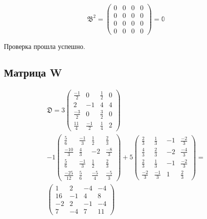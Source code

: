 \documentclass[12pt, a4paper]{article}
\begin{document}
    \begin{equation}
        \mathfrak{B}^2 = \left(\begin{matrix}
            0 & 0 & 0 & 0 \\
            0 & 0 & 0 & 0 \\
            0 & 0 & 0 & 0 \\
            0 & 0 & 0 & 0
        \end{matrix}\right) = \mathbb{0}
    \end{equation}

    Проверка прошла успешно.




    \subsection{Матрица W}

    \begin{multline}
        \mathfrak{D} = 3 \left(\begin{matrix}
            \frac{-1}{2} & 0 & \frac{1}{2} & 0 \\
            2 & -1 & 4 & 4 \\
            \frac{-3}{2} & 0 & \frac{3}{2} & 0 \\
            \frac{11}{4} & \frac{-1}{2} & \frac{1}{4} & 2
        \end{matrix}\right) \\ 
        - 1 \left(\begin{matrix}
            \frac{5}{6} & \frac{-1}{3} & \frac{1}{2} & \frac{2}{3} \\
            \frac{-10}{3} & \frac{4}{3} & -2 & \frac{-8}{3} \\
            \frac{5}{6} & \frac{-1}{3} & \frac{1}{2} & \frac{2}{3} \\
            \frac{-25}{12} & \frac{5}{6} & \frac{-5}{4} & \frac{-5}{3}
        \end{matrix}\right) + 5 \left(\begin{matrix}
            \frac{2}{3} & \frac{1}{3} & -1 & \frac{-2}{3} \\
            \frac{4}{3} & \frac{2}{3} & -2 & \frac{-4}{3} \\
            \frac{2}{3} & \frac{1}{3} & -1 & \frac{-2}{3} \\
            \frac{-2}{3} & \frac{-1}{3} & 1 & \frac{2}{3}
        \end{matrix}\right) = \\ \left(\begin{matrix}
            1 & 2 & -4 & -4 \\
            16 & -1 & 4 & 8 \\
            -2 & 2 & -1 & -4 \\
            7 & -4 & 7 & 11
        \end{matrix}\right)
    \end{multline}
\end{document}

